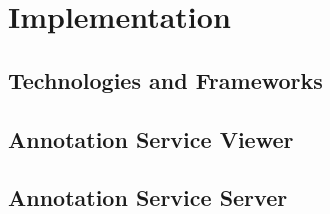 \section{Implementation}
\subsection{Technologies and Frameworks}
\subsection{Annotation Service Viewer}
\subsection{Annotation Service Server}
